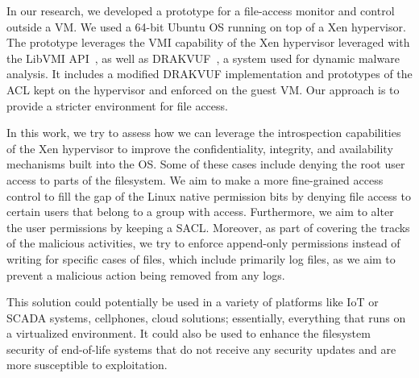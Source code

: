 \par In our research, we developed a prototype for a file-access monitor and control outside a \ac{VM}. We used a 64-bit Ubuntu OS running on top of a Xen hypervisor. The prototype leverages the \ac{VMI} capability of the Xen hypervisor leveraged with the LibVMI \ac{API}~\cite{payne2011libvmi}, as well as DRAKVUF~\cite{lengyel2014drakvuf}, a system used for dynamic malware analysis. It includes a modified DRAKVUF implementation and prototypes of the \ac{ACL} kept on the hypervisor and enforced on the guest \ac{VM}. Our approach is to provide a stricter environment for file access.

\par In this work, we try to assess how we can leverage the introspection capabilities of the Xen hypervisor to improve the confidentiality, integrity, and availability mechanisms built into the \ac{OS}. Some of these cases include denying the root user access to parts of the filesystem. We aim to make a more fine-grained access control to fill the gap of the Linux native permission bits by denying file access to certain users that belong to a group with access. Furthermore, we aim to alter the user permissions by keeping a \ac{SACL}. Moreover, as part of covering the tracks of the malicious activities, we try to enforce append-only permissions instead of writing for specific cases of files, which include primarily log files, as we aim to prevent a malicious action being removed from any logs. 

\par This solution could potentially be used in a variety of platforms like \ac{IoT} or \ac{SCADA} systems, cellphones, cloud solutions; essentially, everything that runs on a virtualized environment. It could also be used to enhance the filesystem security of end-of-life systems that do not receive any security updates and are more susceptible to exploitation.

